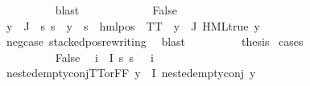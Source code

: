 \begin{isabellebody}
\ \ \ \ \ \ \ \ \isamarkupfalse%
\ blast\isanewline
\ \ \ \ \isamarkupfalse%
\isanewline
\ \ \ \ \ \ \isamarkupfalse%
\ False\isanewline
\ \ \ \ \ \ \isamarkupfalse%
\ {\isachardoublequoteopen}{\isasymforall}y\ {\isasymin}\ {\isasymPhi}{\isacharbackquote}{\kern0pt}J{\isachardot}{\kern0pt}\ {\isasymexists}{\isasymalpha}{\isachardot}{\kern0pt}\ {\isacharparenleft}{\kern0pt}{\isasymforall}s{\isachardot}{\kern0pt}\ {\isacharparenleft}{\kern0pt}s\ {\isasymTurnstile}\ y{\isacharparenright}{\kern0pt}\ {\isasymlongleftrightarrow}\ {\isacharparenleft}{\kern0pt}s\ {\isasymTurnstile}\ {\isacharparenleft}{\kern0pt}hml{\isacharunderscore}{\kern0pt}pos\ {\isasymalpha}\ TT{\isacharparenright}{\kern0pt}{\isacharparenright}{\kern0pt}{\isacharparenright}{\kern0pt}{\isachardoublequoteclose}\ {\isacharbar}{\kern0pt}\ {\isachardoublequoteopen}{\isacharparenleft}{\kern0pt}{\isasymexists}y{\isasymin}{\isasymPhi}\ {\isacharbackquote}{\kern0pt}\ J{\isachardot}{\kern0pt}\ HML{\isacharunderscore}{\kern0pt}true\ y{\isacharparenright}{\kern0pt}{\isachardoublequoteclose}\isanewline
\ \ \ \ \ \ \ \ \isamarkupfalse%
\ neg{\isacharunderscore}{\kern0pt}case\ stacked{\isacharunderscore}{\kern0pt}pos{\isacharunderscore}{\kern0pt}rewriting\ \isamarkupfalse%
\ blast\isanewline
\ \ \ \ \ \ \isamarkupfalse%
\ \isamarkupfalse%
\ {\isacharquery}{\kern0pt}thesis\ \isamarkupfalse%
{\isacharparenleft}{\kern0pt}cases{\isacharparenright}{\kern0pt}\isanewline
\ \ \ \ \ \ \ \ \isamarkupfalse%
\ {}\isanewline
\ \ \ \ \ \ \ \ \isamarkupfalse%
\ False\ \isamarkupfalse%
\ {\isachardoublequoteopen}{\isasymforall}i\ {\isasymin}\ I{\isachardot}{\kern0pt}\ {\isacharparenleft}{\kern0pt}{\isasymforall}s{\isachardot}{\kern0pt}\ {\isacharparenleft}{\kern0pt}s\ {\isasymTurnstile}\ {\isacharparenleft}{\kern0pt}{\isasymPhi}\ i{\isacharparenright}{\kern0pt}{\isacharparenright}{\kern0pt}{\isacharparenright}{\kern0pt}{\isachardoublequoteclose}\isanewline
\ \ \ \ \ \ \ \ \isamarkupfalse%
\ nested{\isacharunderscore}{\kern0pt}empty{\isacharunderscore}{\kern0pt}conj{\isacharunderscore}{\kern0pt}TT{\isacharunderscore}{\kern0pt}or{\isacharunderscore}{\kern0pt}FF\ {\isacartoucheopen}{\isasymforall}y{\isasymin}{\isasymPhi}\ {\isacharbackquote}{\kern0pt}\ I{\isachardot}{\kern0pt}\ nested{\isacharunderscore}{\kern0pt}empty{\isacharunderscore}{\kern0pt}conj\ y{\isacartoucheclose}\ \isamarkupfalse%

\end{isabellebody}
